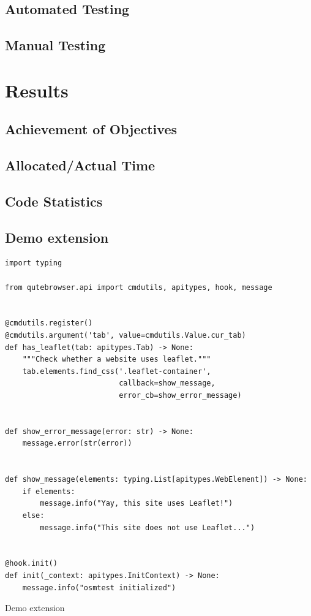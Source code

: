 \documentclass[a4paper,parskip=full,DIV=14,BCOR=15mm]{scrreprt}
\begin{document}
\section{Automated Testing}

\section{Manual Testing}


\chapter{Results}
\label{ch:results}

\section{Achievement of Objectives}


\section{Allocated/Actual Time}
\section{Code Statistics}

\section{Demo extension}
\begin{listing}
\begin{verbatim}
import typing

from qutebrowser.api import cmdutils, apitypes, hook, message


@cmdutils.register()
@cmdutils.argument('tab', value=cmdutils.Value.cur_tab)
def has_leaflet(tab: apitypes.Tab) -> None:
    """Check whether a website uses leaflet."""
    tab.elements.find_css('.leaflet-container',
                          callback=show_message,
                          error_cb=show_error_message)


def show_error_message(error: str) -> None:
    message.error(str(error))


def show_message(elements: typing.List[apitypes.WebElement]) -> None:
    if elements:
        message.info("Yay, this site uses Leaflet!")
    else:
        message.info("This site does not use Leaflet...")


@hook.init()
def init(_context: apitypes.InitContext) -> None:
    message.info("osmtest initialized")
\end{verbatim}
\caption{Demo extension}
\end{listing}
\end{document}
